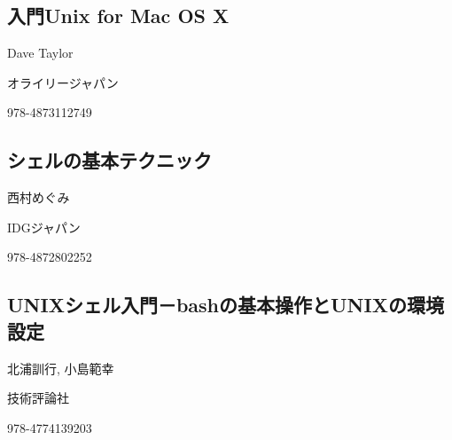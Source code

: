 \documentclass[titlepage,10pt,a4paper]{jsbook}
\begin{document}
\subsection*{入門Unix for Mac OS X}
\begin{description}\small\setlength{\baselineskip}{1.1em}
\item[著者] Dave Taylor
\item[出版社] オライリージャパン
\item[ISBN13] 978-4873112749
\end{description}

\subsection*{シェルの基本テクニック}
\begin{description}\small\setlength{\baselineskip}{1.1em}
\item[著者] 西村めぐみ
\item[出版社] IDGジャパン
\item[ISBN13] 978-4872802252
\end{description}

\subsection*{UNIXシェル入門－bashの基本操作とUNIXの環境設定}
\begin{description}\small\setlength{\baselineskip}{1.1em}
\item[著者] 北浦訓行, 小島範幸
\item[出版社] 技術評論社
\item[ISBN13] 978-4774139203
\end{description}


\end{document}
